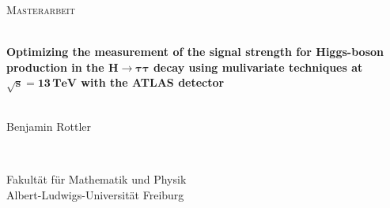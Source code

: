 \begin{titlepage}
    \begin{center}
        \begin{flushleft}
            \Large \textsc{Masterarbeit}\\[0.5cm]
        \end{flushleft}
        \HRule{} \\[0.5cm]
        {\huge \textbf{Optimizing the measurement of the signal strength for Higgs-boson production in the $\bm{H \to \tau\tau}$ decay using mulivariate techniques at $\bm{\sqrt{s} = 13\,\text{TeV}}$ with the ATLAS detector}}\\
        \HRule{} \\[0.5cm]
        \begin{flushleft}
            \Large Benjamin Rottler
        \end{flushleft}
        \vfill
        \HRule{} \\
        \begin{flushright}
            \large
            Fakultät für Mathematik und Physik \\
            Albert-Ludwigs-Universität Freiburg
        \end{flushright}
    \end{center}
\end{titlepage}
